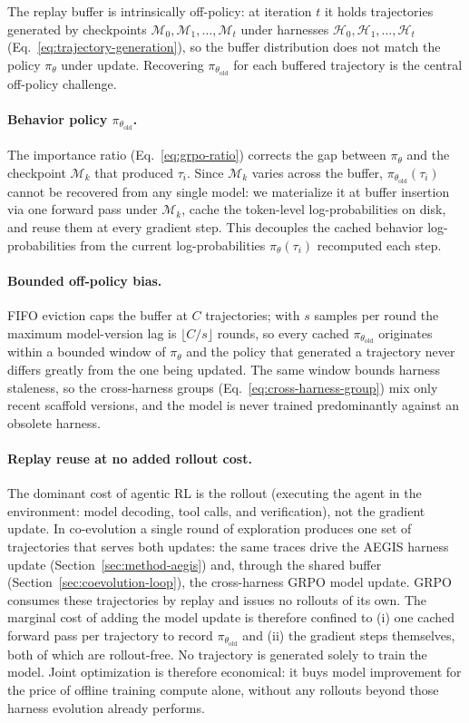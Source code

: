 The replay buffer is intrinsically off-policy: at iteration $t$ it holds trajectories generated by checkpoints $\mathcal{M}_0, \mathcal{M}_1,\dots, \mathcal{M}_t$ under harnesses $\mathcal{H}_0, \mathcal{H}_1, \dots, \mathcal{H}_t$ (Eq.~\ref{eq:trajectory-generation}), so the buffer distribution does not match the policy $\pi_\theta$ under update. Recovering $\pi_{\theta_{\text{old}}}$ for each buffered trajectory is the central off-policy challenge.

\paragraph{Behavior policy $\pi_{\theta_{\text{old}}}$.}
The importance ratio (Eq.~\ref{eq:grpo-ratio}) corrects the gap between $\pi_\theta$ and the checkpoint $\mathcal{M}_{k}$ that produced $\tau_i$. Since $\mathcal{M}_{k}$ varies across the buffer, $\pi_{\theta_{\text{old}}}(\tau_i)$ cannot be recovered from any single model: we materialize it at buffer insertion via one forward pass under $\mathcal{M}_{k}$, cache the token-level log-probabilities on disk, and reuse them at every gradient step. This decouples the cached behavior log-probabilities from the current log-probabilities $\pi_\theta(\tau_i)$ recomputed each step.

\paragraph{Bounded off-policy bias.}
FIFO eviction caps the buffer at $C$ trajectories; with $s$ samples per round the maximum model-version lag is $\lfloor C/s \rfloor$ rounds, so every cached $\pi_{\theta_{\text{old}}}$ originates within a bounded window of $\pi_\theta$ and the policy that generated a trajectory never differs greatly from the one being updated. The same window bounds harness staleness, so the cross-harness groups (Eq.~\ref{eq:cross-harness-group}) mix only recent scaffold versions, and the model is never trained predominantly against an obsolete harness.

\paragraph{Replay reuse at no added rollout cost.}
The dominant cost of agentic RL is the rollout (executing the agent in the environment: model decoding, tool calls, and verification), not the gradient update. In co-evolution a single round of exploration produces one set of trajectories that serves both updates: the same traces drive the AEGIS harness update (Section~\ref{sec:method-aegis}) and, through the shared buffer (Section~\ref{sec:coevolution-loop}), the cross-harness GRPO model update. GRPO consumes these trajectories by replay and issues no rollouts of its own. The marginal cost of adding the model update is therefore confined to (i) one cached forward pass per trajectory to record $\pi_{\theta_{\text{old}}}$ and (ii) the gradient steps themselves, both of which are rollout-free. No trajectory is generated solely to train the model. Joint optimization is therefore economical: it buys model improvement for the price of offline training compute alone, without any rollouts beyond those harness evolution already performs.
